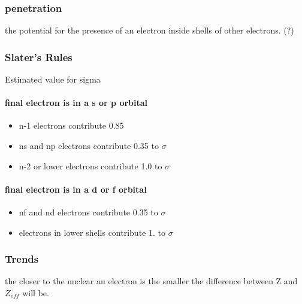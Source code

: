 \documentclass[]{article}
\providecommand{\tightlist}{%
  \setlength{\itemsep}{0pt}\setlength{\parskip}{0pt}}
\let\oldparagraph\paragraph
\renewcommand{\paragraph}[1]{\oldparagraph{#1}\mbox{}}
\begin{document}
\hypertarget{penetration}{%
\subsubsection{penetration}\label{penetration}}

the potential for the presence of an electron inside shells of other
electrons. (?)

\hypertarget{slaters-rules}{%
\subsubsection{Slater's Rules}\label{slaters-rules}}

Estimated value for sigma

\hypertarget{final-electron-is-in-a-s-or-p-orbital}{%
\paragraph{final electron is in a s or p
orbital}\label{final-electron-is-in-a-s-or-p-orbital}}

\begin{itemize}
\tightlist
\item
  n-1 electrons contribute 0.85
\item
  ns and np electrons contribute 0.35 to \(\sigma\quad\)
\item
  n-2 or lower electrons contribute 1.0 to \(\sigma\quad\)
\end{itemize}

\hypertarget{final-electron-is-in-a-d-or-f-orbital}{%
\paragraph{final electron is in a d or f
orbital}\label{final-electron-is-in-a-d-or-f-orbital}}

\begin{itemize}
\tightlist
\item
  nf and nd electrons contribute 0.35 to \(\sigma\quad\)
\item
  electrons in lower shells contribute 1. to \(\sigma\quad\)
\end{itemize}

\hypertarget{trends}{%
\subsubsection{Trends}\label{trends}}

the closer to the nuclear an electron is the smaller the difference
between Z and \(Z_{eff}\) will be.
\end{document}
